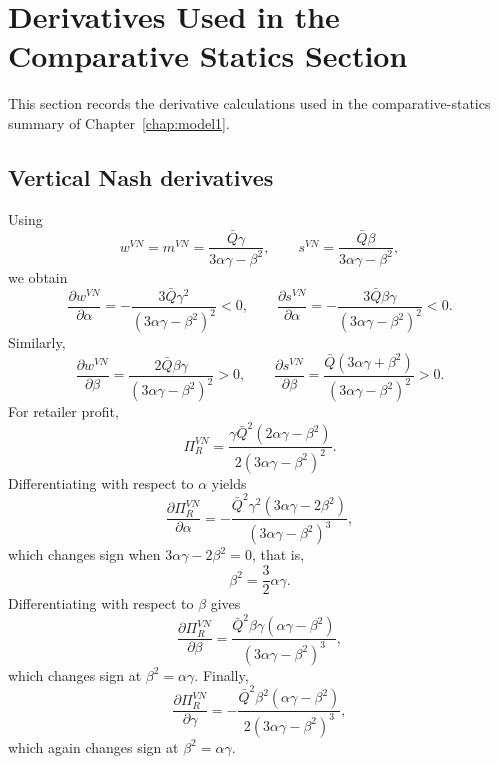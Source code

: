 \section{Derivatives Used in the Comparative Statics Section}
\label{app:comparative_statics}

This section records the derivative calculations used in the comparative-statics
summary of Chapter~\ref{chap:model1}.

\subsection{Vertical Nash derivatives}

Using
\begin{equation}
 w^{VN}=m^{VN}=\frac{\bar Q\gamma}{3\alpha\gamma-\beta^2},
 \qquad
 s^{VN}=\frac{\bar Q\beta}{3\alpha\gamma-\beta^2},
\end{equation}
we obtain
\begin{equation}
 \frac{\partial w^{VN}}{\partial \alpha}
 =-\frac{3\bar Q\gamma^2}{(3\alpha\gamma-\beta^2)^2}<0,
 \qquad
 \frac{\partial s^{VN}}{\partial \alpha}
 =-\frac{3\bar Q\beta\gamma}{(3\alpha\gamma-\beta^2)^2}<0.
\end{equation}
Similarly,
\begin{equation}
 \frac{\partial w^{VN}}{\partial \beta}
 =\frac{2\bar Q\beta\gamma}{(3\alpha\gamma-\beta^2)^2}>0,
 \qquad
 \frac{\partial s^{VN}}{\partial \beta}
 =\frac{\bar Q(3\alpha\gamma+\beta^2)}{(3\alpha\gamma-\beta^2)^2}>0.
\end{equation}
For retailer profit,
\begin{equation}
 \Pi_R^{VN}=\frac{\gamma\bar Q^2(2\alpha\gamma-\beta^2)}{2(3\alpha\gamma-\beta^2)^2}.
\end{equation}
Differentiating with respect to $\alpha$ yields
\begin{equation}
 \frac{\partial \Pi_R^{VN}}{\partial \alpha}
 =-\frac{\bar Q^2\gamma^2(3\alpha\gamma-2\beta^2)}{(3\alpha\gamma-\beta^2)^3},
\end{equation}
which changes sign when $3\alpha\gamma-2\beta^2=0$, that is,
\begin{equation}
 \beta^2=\frac{3}{2}\alpha\gamma.
\end{equation}
Differentiating with respect to $\beta$ gives
\begin{equation}
 \frac{\partial \Pi_R^{VN}}{\partial \beta}
 =\frac{\bar Q^2\beta\gamma(\alpha\gamma-\beta^2)}{(3\alpha\gamma-\beta^2)^3},
\end{equation}
which changes sign at $\beta^2=\alpha\gamma$.
Finally,
\begin{equation}
 \frac{\partial \Pi_R^{VN}}{\partial \gamma}
 =-\frac{\bar Q^2\beta^2(\alpha\gamma-\beta^2)}{2(3\alpha\gamma-\beta^2)^3},
\end{equation}
which again changes sign at $\beta^2=\alpha\gamma$.

